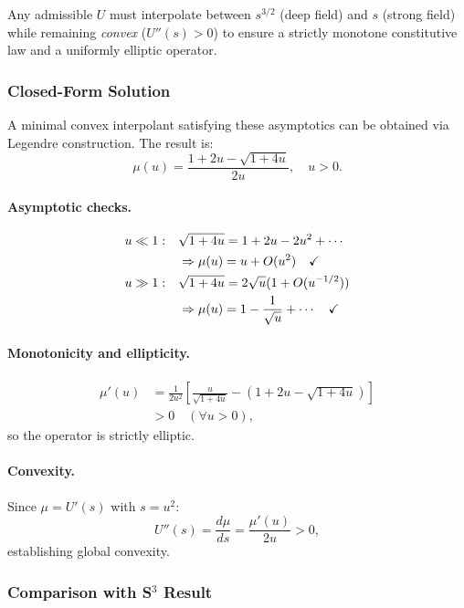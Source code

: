 Any admissible $U$ must interpolate between $s^{3/2}$ (deep field) and $s$ 
(strong field) while remaining \textit{convex} ($U''(s) > 0$) to ensure 
a strictly monotone constitutive law and a uniformly elliptic operator.

\subsubsection{Closed-Form Solution}

A minimal convex interpolant satisfying these asymptotics can be obtained 
via Legendre construction. The result is:
\begin{equation}
\boxed{\mu(u) = \frac{1 + 2u - \sqrt{1 + 4u}}{2u}}, \quad u > 0.
\label{eq:mu-variational}
\end{equation}

\paragraph{Asymptotic checks.}
\begin{align}
u \ll 1: \quad &\sqrt{1+4u} = 1 + 2u - 2u^2 + \cdots \notag\\
&\Rightarrow \mu(u) = u + O(u^2) \quad \checkmark \\
u \gg 1: \quad &\sqrt{1+4u} = 2\sqrt{u}(1 + O(u^{-1/2})) \notag\\
&\Rightarrow \mu(u) = 1 - \frac{1}{\sqrt{u}} + \cdots \quad \checkmark
\end{align}

\paragraph{Monotonicity and ellipticity.}
\begin{align}
\mu'(u) &= \frac{1}{2u^2}\left[\frac{u}{\sqrt{1+4u}} - (1 + 2u - \sqrt{1+4u})\right] \nonumber\\
&> 0 \quad (\forall u > 0),
\end{align}
so the operator is strictly elliptic.

\paragraph{Convexity.}
Since $\mu = U'(s)$ with $s = u^2$:
\begin{equation}
U''(s) = \frac{d\mu}{ds} = \frac{\mu'(u)}{2u} > 0,
\end{equation}
establishing global convexity.

\subsubsection{Comparison with S$^3$ Result}

